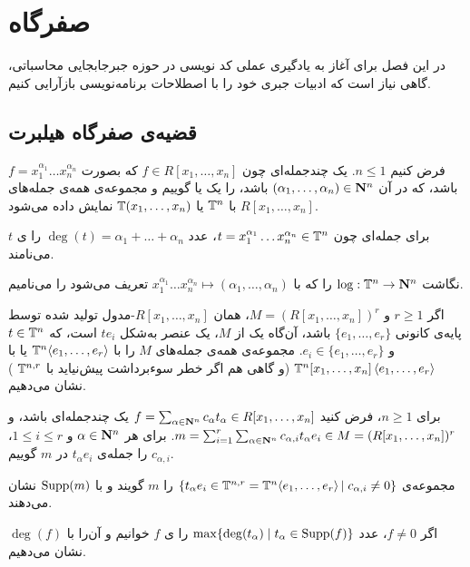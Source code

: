
\chapter{صفرگاه}
در این فصل برای آغاز به یادگیری عملی کد نویسی در حوزه جبرجابجایی محاسباتی، گاهی نیاز است که ادبیات جبری خود را با اصطلاحات برنامه‌نویسی بازآرایی کنیم.
\section{قضیه‌ی صفرگاه هیلبرت}
فرض کنیم
$n\le 1$.
یک چندجمله‌ای چون
$f\in R[x_1,\dots,x_n]$
که بصورت
$f=x_1^{\alpha_1}\dots x_n^{\alpha_n}$
باشد، که در آن 
$(\alpha_1,\dots,\alpha_n)\in{\bf N}^n$
باشد، را یک  یا  گوییم و مجموعه‌ی همه‌ی جمله‌های 
$R[x_1,\dots,x_n]$
با
${\Bbb T}^n$ 
یا
${\Bbb T}(x_1,\dots,x_n)$
نمایش داده می‌شود.

برای جمله‌ای چون
$t=x_1^{\alpha_1}\dots x_n^{\alpha_n}\in{\Bbb T}^n$،
عدد
$\deg(t)=\alpha_1+\dots+\alpha_n$
را ی $t$ می‌نامند.

نگاشت
$\log:{\Bbb T}^n\to{\bf N}^n$
را که با 
$x_1^{\alpha_1}\dots x_n^{\alpha_n}\mapsto(\alpha_1,\dots,\alpha_n)$
تعریف می‌شود را  می‌نامیم.

اگر
$r\ge 1$
و
$M=(R[x_1,\dots,x_n])^r$،
همان $R[x_1,\dots,x_n]$-مدول تولید شده توسط پایه‌ی کانونی
$\{e_1,\dots,e_r\}$
باشد، آن‌گاه یک   از $M$، یک عنصر به‌شکل
$te_i$
است، که 
$t\in{\Bbb T}^n$
و
$e_i\in\{e_1,\dots,e_r\}$.
مجموعه‌ی همه‌ی جمله‌های $M$ را با
${\Bbb T}^n\!\left<e_1,\dots,e_r\right>$
یا با
${\Bbb T}^n[x_1,\dots,x_n]\left<e_1,\dots,e_r\right>$
(و گاهی هم اگر خطر سوءبرداشت پیش‌نیاید با
${\Bbb T}^{n,r}$
)
نشان می‌دهیم.

برای $n\ge1$، فرض کنید 
$f=\sum_{\alpha\in{\bf N}^n}c_\alpha t_\alpha\in R[x_1,\dots,x_n]$
یک چندجمله‌ای باشد، و
$m=\sum_{i=1}^r\sum_{\alpha\in{\bf N}^n}c_{\alpha,i} t_\alpha e_i\in M=(R[x_1,\dots,x_n])^r$.
برای هر
$\alpha\in{\bf N}^n$
و 
$1\le i\le r$،
$c_{\alpha,i}$
را  جمله‌ی $t_\alpha e_i$ در $m$ گوییم.

مجموعه‌ی
$\{t_\alpha e_i\in {\Bbb T}^{n,r}={\Bbb T}^n\!\left<e_1,\dots,e_r\right>|\; c_{\alpha,i}\ne 0\}$
را  $m$ گویند و با
$\operatorname{Supp}(m)$
نشان می‌دهند.

اگر 
$f\ne 0$،
عدد 
$\max\{\deg(t_\alpha)\;|\;t_\alpha\in\operatorname{Supp}(f)\}$
را ی $f$ خوانیم و آن‌را با
$\deg(f)$
نشان می‌دهیم.
